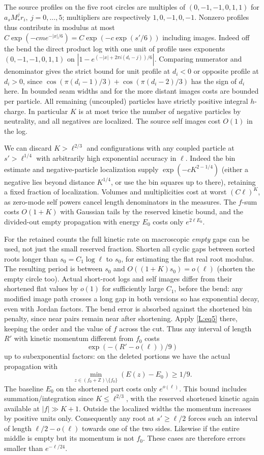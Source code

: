 The source profiles on the five root circles are multiples of \((0,-1,-1,0,1,1)\) for \(a_s M_*^j r_i,\ j=0,\ldots,5\); multipliers are respectively \(1,0,-1,0,-1\). Nonzero profiles thus contribute in modulus at most \(C\exp(-c m e^{-|x|/6})=C\exp(-c\exp(s'/6))\) including images. Indeed off the bend the direct product log with one unit of profile uses exponents \((0,-1,-1,0,1,1)\) on \(\left|1-e^{(-|x|+2\pi i(d_i-j))/6}\right|\). Comparing numerator and denominator gives the strict bound for unit profile at \(d_i<0\) or opposite profile at \(d_i>0\), since \(\cos(\pi(d_i-1)/3)+\cos(\pi(d_i-2)/3)\) has the sign of \(d_i\) here. In bounded seam widths and for the more distant images costs are bounded per particle. All remaining (uncoupled) particles have strictly positive integral \(h\)-charge. In particular \(K\) is at most twice the number of negative particles by neutrality, and all negatives are localized. The source self images cost \(O(1)\) in the log.

We can discard \(K>\ell^{2/3}\) and configurations with any coupled particle at \(s'>\ell^{1/4}\) with arbitrarily high exponential accuracy in \(\ell\). Indeed the bin estimate and negative-particle localization supply \(\exp(-c K^{2-1/4})\) (either a negative lies beyond distance \(K^{1/4}\), or use the bin squares up to there), retaining a fixed fraction of localization. Volumes and multiplicities cost at worst \((C\ell)^K\), as zero-mode self powers cancel length denominators in the measures. The \(f\)-sum costs \(O(1+K)\) with Gaussian tails by the reserved kinetic bound, and the divided-out empty propagation with energy \(E_0\) costs only \(e^{2\ell E_0}\).

For the retained counts the full kinetic rate on macroscopic \emph{empty} gaps can be used, not just the small reserved fraction. Shorten all cyclic gaps between sorted roots longer than \(s_0=C_1\log\ell\) to \(s_0\), for estimating the flat real root modulus. The resulting period is between \(s_0\) and \(O((1+K)s_0)=o(\ell)\) (shorten the empty circle too). Actual short-root logs and self images differ from their shortened flat values by \(o(1)\) for sufficiently large \(C_1\), before the bend: any modified image path crosses a long gap in both versions so has exponential decay, even with Jordan factors. The bend error is absorbed against the shortened bin penalty, since near pairs remain near after shortening. Apply \eqref{L:eq5} there, keeping the order and the value of \(f\) across the cut. Thus any interval of length \(R'\) with kinetic momentum different from \(f_0\) costs
\[
 \exp(-(R'-o(\ell))/9)
\]
up to subexponential factors: on the deleted portions we have the actual propagation with \[\min_{z\in(f_0+\mathbb Z)\setminus\{f_0\}} (E(z)-E_0)\ge1/9.\] The baseline \(E_0\) on the shortened part costs only \(e^{o(\ell)}\). This bound includes summation/integration since \(K\le\ell^{2/3}\), with the reserved shortened kinetic again available at \(|f|\gg K+1\). Outside the localized widths the momentum increases by positive units only. Consequently any root at \(s'\ge\ell/2\) forces such an interval of length \(\ell/2-o(\ell)\) towards one of the two sides. Likewise if the entire middle is empty but its momentum is not \(f_0\). These cases are therefore errors smaller than \(e^{-\ell/24}\).

